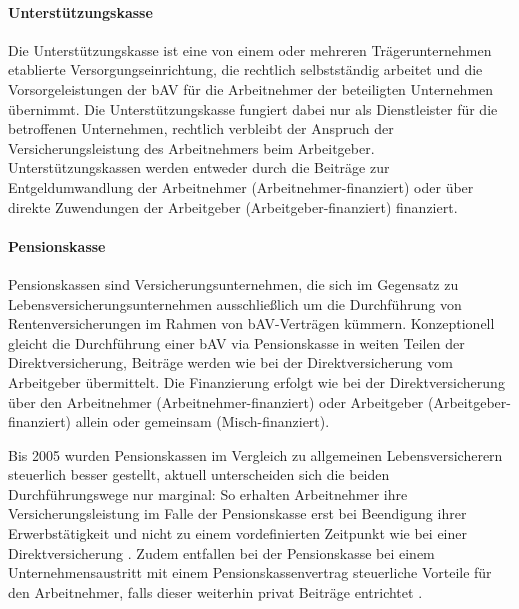 \paragraph*{Unterstützungskasse}
Die Unterstützungskasse ist eine von einem oder mehreren Trägerunternehmen etablierte Versorgungseinrichtung, die rechtlich selbstständig arbeitet und die Vorsorgeleistungen der bAV für die Arbeitnehmer der beteiligten Unternehmen übernimmt. Die Unterstützungskasse fungiert dabei nur als Dienstleister für die betroffenen Unternehmen, rechtlich verbleibt der Anspruch der Versicherungsleistung des Arbeitnehmers beim Arbeitgeber. Unterstützungskassen werden entweder durch die Beiträge zur Entgeldumwandlung der Arbeitnehmer (Arbeitnehmer-finanziert) oder über direkte Zuwendungen der Arbeitgeber (Arbeitgeber-finanziert) finanziert. %

\paragraph*{Pensionskasse}

Pensionskassen sind Versicherungsunternehmen, die sich im Gegensatz zu Lebensversicherungsunternehmen ausschließlich um die Durchführung von Rentenversicherungen im Rahmen von bAV-Verträgen kümmern. Konzeptionell gleicht die Durchführung einer bAV via Pensionskasse in weiten Teilen der Direktversicherung, Beiträge werden wie bei der Direktversicherung vom Arbeitgeber übermittelt. Die Finanzierung erfolgt wie bei der Direktversicherung über den Arbeitnehmer (Arbeitnehmer-finanziert) oder Arbeitgeber (Arbeitgeber-finanziert) allein oder gemeinsam (Misch-finanziert). 

Bis 2005 wurden Pensionskassen im Vergleich zu allgemeinen Lebensversicherern steuerlich besser gestellt, aktuell unterscheiden sich die beiden Durchführungswege nur marginal: So erhalten Arbeitnehmer ihre Versicherungsleistung im Falle der Pensionskasse erst bei Beendigung ihrer Erwerbstätigkeit und nicht zu einem vordefinierten Zeitpunkt wie bei einer Direktversicherung \cite[S. 191]{buttler2017einfuehrung}. Zudem entfallen bei der Pensionskasse bei einem Unternehmensaustritt mit einem Pensionskassenvertrag steuerliche Vorteile für den Arbeitnehmer, falls dieser weiterhin privat Beiträge entrichtet \cite[S. 192]{buttler2017einfuehrung}.

